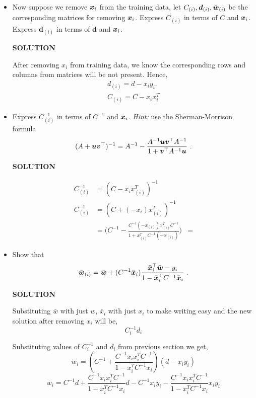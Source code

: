 \documentclass{article}
\begin{document}
\begin{itemize}
\item Now suppose we remove $\boldsymbol{x}_i$ from the training data, let $C_{(i)}, \boldsymbol{d}_{(i)}, \bar{\boldsymbol{w}}_{(i)}$ be the corresponding matrices for removing $\boldsymbol{x}_i$. Express $C_{(i)}$ in terms of $C$ and $\boldsymbol{x}_i$. Express $\boldsymbol{d}_{(i)}$ in terms of $\boldsymbol{d}$ and $\boldsymbol{x}_i$. 

\textbf{SOLUTION}
\begin{mdframed}[backgroundcolor=lightgray]
After removing $x_i$ from training data, we know the corresponding rows and columns from matrices will be not present.
Hence, 
\begin{align*}
    d_{(i)} = d - x_i y_i.\\
    C_{(i)} = C - x_i x_i^T
\end{align*}
\end{mdframed}

\item Express $C_{(i)}^{-1}$ in terms of $C^{-1}$ and $\boldsymbol{x}_i$.
\textsl{Hint:} use the Sherman-Morrison formula
\begin{align}
    (A + \boldsymbol{u}\boldsymbol{v}^\top)^{-1} = A^{-1} - \frac{A^{-1}\boldsymbol{u}\boldsymbol{v}^\top A^{-1}}{1 + \boldsymbol{v}^\top A^{-1} \boldsymbol{u}}~.
\end{align}

\textbf{SOLUTION}
\begin{mdframed}[backgroundcolor=lightgray]
\begin{align*}
    C_{(i)}^{-1} &= (C - x_i x_{(i)}^T)^{-1}\\
    C_{(i)}^{-1} &= (C + (-x_i) x_{(i)}^T)^{-1}\\
    &= \big( C^{-1} - \frac{C^{-1} (-x_{(i)}) x_{(i)}^T C^{-1} } {1 + x_{(i)}^T C^{-1} (-x_{(i)})} \big)
    &= 
\end{align*}
\end{mdframed}

\item Show that
\begin{align}
    \bar{\boldsymbol{w}}_{(i)}  = \bar{\boldsymbol{w}} + (C^{-1} \bar{\boldsymbol{x}}_i)\frac{\bar{\boldsymbol{x}}_i^\top\bar{\boldsymbol{w}}-y_i}{ 1 - \bar{\boldsymbol{x}}_i^\top C^{-1} \bar{\boldsymbol{x}}_i}~.
\end{align}

\textbf{SOLUTION}
\begin{mdframed}[backgroundcolor=lightgray]
Substituting $\bar{w}$ with just $w$, $\bar{x}_i$ with just $x_i$ to make writing easy and the new solution after removing $x_i$ will be,
\[
C_i^{-1}d_i
\]

Substituting values of $C_i^{-1}$ and $d_i$ from previous section we get,
\[
w_i = (C^{-1} + \frac{C^{-1}x_ix_i^TC^{-1}}{1 - x_i^TC^{-1}x_i})(d - x_iy_i)
\]
\[
w_i = C^{-1}d + \frac{C^{-1}x_ix_i^TC^{-1}}{1 - x_i^TC^{-1}x_i}d - C^{-1}x_iy_i - \frac{C^{-1}x_ix_i^TC^{-1}}{1 - x_i^TC^{-1}x_i}x_iy_i
\]


\end{mdframed}
\end{itemize}
\end{document}

